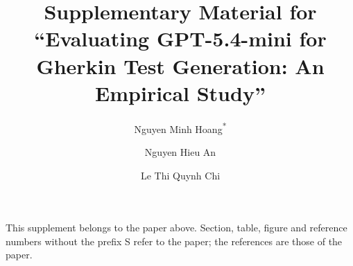 \documentclass[runningheads]{llncs}
\begin{document}
\title{Supplementary Material for ``Evaluating GPT-5.4-mini for Gherkin Test Generation: An Empirical Study''}

\author{Nguyen Minh Hoang\textsuperscript{*} \and Nguyen Hieu An \and Le Thi Quynh Chi}

\maketitle

\noindent This supplement belongs to the paper above. Section, table, figure and reference numbers without the prefix S refer to the paper; the references are those of the paper.




\end{document}
